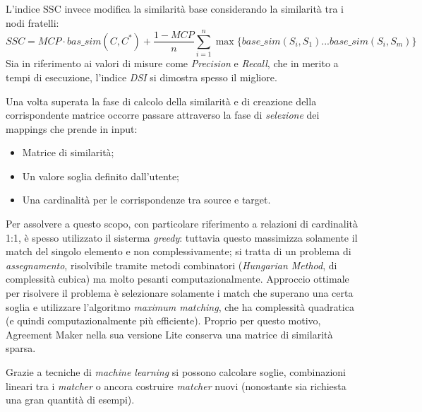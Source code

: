 \documentclass[11pt]{article}
\begin{document}
L'indice SSC invece modifica la similarità base considerando la similarità tra i nodi fratelli:
\begin{equation*}
  SSC = MCP \cdot bas\_sim(C, C^*) + \frac{1-MCP}{n}\sum_{i=1}^n{\max\{base\_sim(S_i, S_1) ... base\_sim(S_i, S_m)\}}
\end{equation*}
Sia in riferimento ai valori di misure come \textit{Precision} e \textit{Recall}, che in merito a tempi di esecuzione, l'indice \textit{DSI} si dimostra spesso il migliore.

Una volta superata la fase di calcolo della similarità e di creazione della corrispondente matrice occorre passare attraverso la fase di \textit{selezione} dei mappings che prende in input:
\begin{itemize}
\item Matrice di similarità;
\item Un valore soglia definito dall'utente;
\item Una cardinalità per le corrispondenze tra source e target.
\end{itemize}
Per assolvere a questo scopo, con particolare riferimento a relazioni di cardinalità 1:1, è spesso utilizzato il sisterma \textit{greedy}: tuttavia questo massimizza solamente il match del singolo elemento e non complessivamente; si tratta di un problema di \textit{assegnamento}, risolvibile tramite metodi combinatori (\textit{Hungarian Method}, di complessità cubica) ma molto pesanti computazionalmente.
Approccio ottimale per risolvere il problema è selezionare solamente i match che superano una certa soglia e utilizzare l'algoritmo \textit{maximum matching}, che ha complessità quadratica (e quindi computazionalmente più efficiente).
Proprio per questo motivo, Agreement Maker nella sua versione Lite conserva una matrice di similarità sparsa.

Grazie a tecniche di \textit{machine learning} si possono calcolare soglie, combinazioni lineari tra i \textit{matcher} o ancora costruire \textit{matcher} nuovi (nonostante sia richiesta una gran quantità di esempi).
\end{document}

